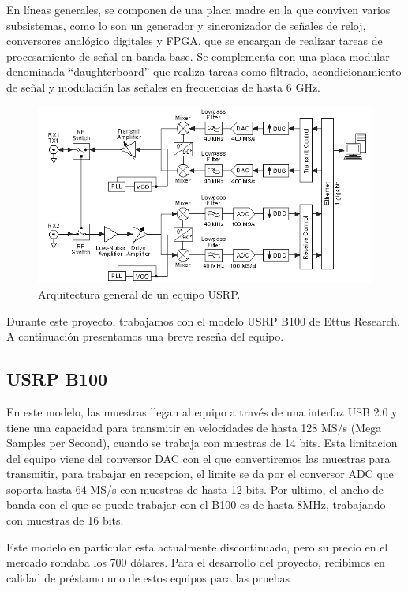 En líneas generales, se componen de una placa madre en la que conviven varios subsistemas, como lo son un generador y sincronizador de señales de reloj, conversores analógico digitales y \gls{FPGA}, que se encargan de realizar tareas de procesamiento de señal en banda base. Se complementa con una placa modular denominada “daughterboard” que realiza tareas como filtrado, acondicionamiento de señal y modulación las señales en frecuencias de hasta 6 GHz.

\begin{figure}[h!]
	\centering
	\includegraphics[scale=0.55]{figuras/cap04/usrp_arq}
	\caption{\label{f:usrp_arq} Arquitectura general de un equipo USRP.}
\end{figure}

Durante este proyecto, trabajamos con el modelo USRP B100 de Ettus Research. A continuación presentamos una breve reseña del equipo.

\subsection{USRP B100}

En este modelo, las muestras llegan al equipo a través de una interfaz USB 2.0 y tiene una capacidad para transmitir en velocidades de hasta 128 MS/s (Mega Samples per Second), cuando se trabaja con muestras de 14 bits. Esta limitacion del equipo viene del conversor DAC con el que convertiremos las muestras para transmitir, para trabajar en recepcion, el limite se da por el conversor \gls{ADC} que soporta hasta 64 MS/s con muestras de hasta 12 bits. Por ultimo, el ancho de banda con el que se puede trabajar con el B100 es de hasta 8MHz, trabajando con muestras de 16 bits.\cite{b100}  

Este modelo en particular esta actualmente discontinuado, pero su precio en el mercado rondaba los 700 dólares. Para el desarrollo del proyecto, recibimos en calidad de préstamo uno de estos equipos para las pruebas

